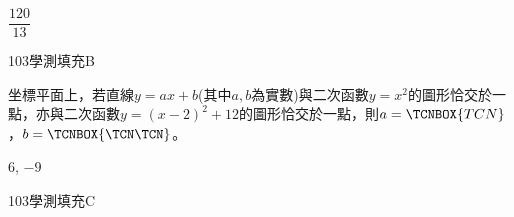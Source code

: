 \begin{QUESTIONS}
\begin{QUESTION}
\begin{QBODY}
\begin{tikzpicture}[scale=1.5]
			\end{tikzpicture}
        \end{QBODY}
        \begin{QFROMS}
        \end{QFROMS}
        \begin{QTAGS}\end{QTAGS}
        \begin{QANS}
            $\dfrac{120}{13}$
        \end{QANS}
        \begin{QSOLLIST}
        \end{QSOLLIST}
        \begin{QEMPTYSPACE}
        \end{QEMPTYSPACE}
    \end{QUESTION}
    \begin{QUESTION}
        \begin{ExamInfo}{103}{學測}{填充}{B}
        \end{ExamInfo}
        \begin{ExamAnsRateInfo}{15}{42}{3}{0}
        \end{ExamAnsRateInfo}
        \begin{QBODY}
			坐標平面上，若直線$y=ax+b$(其中$a,b$為實數)與二次函數$y={{x}^{2}}$的圖形恰交於一點，亦與二次函數$y={{(x-2)}^{2}}+12$的圖形恰交於一點，則$a=\TCNBOX{TCN}$，$b=\TCNBOX{\TCN\TCN}$。
        \end{QBODY}
        \begin{QFROMS}
        \end{QFROMS}
        \begin{QTAGS}\end{QTAGS}
        \begin{QANS}
            $6$, $-9$
        \end{QANS}
        \begin{QSOLLIST}
        \end{QSOLLIST}
        \begin{QEMPTYSPACE}
        \end{QEMPTYSPACE}
    \end{QUESTION}
    \begin{QUESTION}
        \begin{ExamInfo}{103}{學測}{填充}{C}
        \end{ExamInfo}
        \begin{ExamAnsRateInfo}{49}{87}{53}{7}
        \end{ExamAnsRateInfo}
        \begin{QBODY}

\end{QBODY}
\end{QUESTION}
\end{QUESTIONS}
